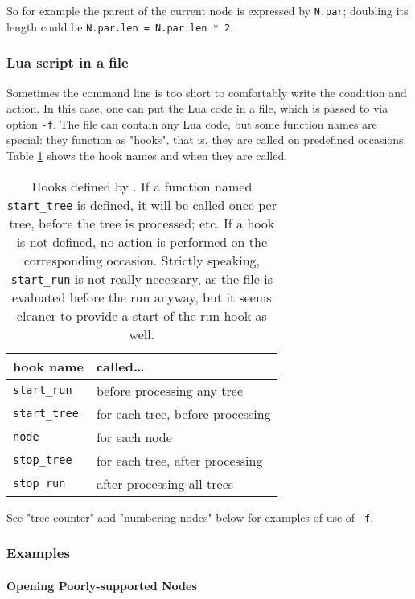 \noindent{}So for example the parent of the current node is expressed by
\texttt{N.par}; doubling its length could be \texttt{N.par.len = N.par.len * 2}.

\subsubsection{Lua script in a file}
\label{sct:lua_file_input}

Sometimes the command line is too short to comfortably write the condition and
action. In this case, one can put the Lua code in a file, which is passed to
\luaed{} via option \texttt{-f}. The file can contain any Lua code, but some
function names are special: they function as "hooks", that is, they are called
on predefined occasions. Table \ref{tbl:luaedHooks} shows the hook names and
when they are called.

\begin{table}
	\centering
	\begin{tabular}{ll}
		hook name & called\ldots \\
		\hline
		\texttt{start\_run} 	& before processing any tree \\
		\texttt{start\_tree}	& for each tree, before processing \\
		\texttt{node}					& for each node \\
		\texttt{stop\_tree}		& for each tree, after processing \\
		\texttt{stop\_run}			& after processing all trees
	\end{tabular}
	\caption{%
		\label{tbl:luaedHooks}
		Hooks defined by \luaed. If a function named \texttt{start\_tree} is
		defined, it will be called once per tree, before the tree is processed; etc.
		If a hook is not defined, no action is performed on the corresponding
		occasion. Strictly speaking, \texttt{start\_run} is not really necessary, as
		the file is evaluated before the run anyway, but it seems cleaner to provide
		a start-of-the-run hook as well.
	}
\end{table}

See "tree counter" and "numbering nodes" below for examples of use of
\texttt{-f}.

\subsubsection{Examples}

\paragraph{Opening Poorly-supported Nodes}
\label{sct:ed_ed}

